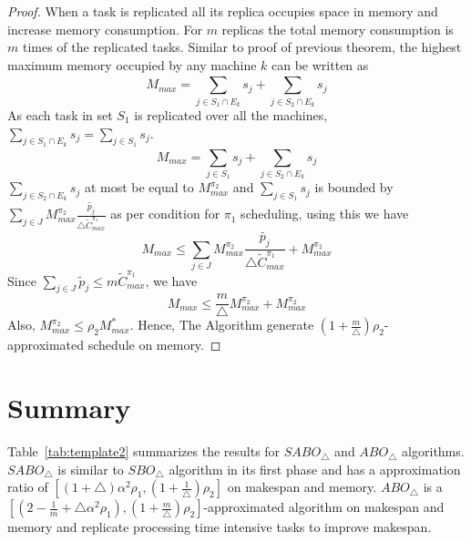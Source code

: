 \documentclass[twocolumn]{svjour3}
\begin{document}
\begin{proof}           
  When a task is replicated all its replica occupies space in memory
  and increase memory consumption. For $m$ replicas the total memory
  consumption is $m$ times of the replicated tasks. Similar to proof
  of previous theorem, the highest maximum memory occupied by any
  machine $k$ can be written as
  \begin{equation}\nonumber
    M_{max}= \sum_{j \in S_1\cap E_k}^{}s_j+\sum_{j \in S_2\cap E_k}^{}s_j           
  \end{equation}
  As each task in set $S_1$ is replicated over all the
  machines,$\sum\limits _{j \in S_1\cap E_k}^{}s_j =\sum\limits _{j
    \in S_1}^{}s_j$.
  \begin{equation}\nonumber
    M_{max} = \sum_{j\in S_1}^{}s_j+\sum_{j \in S_2\cap E_k}^{}s_j           
  \end{equation}    
  $\sum\limits_{j \in S_2\cap E_k}^{}s_j$ at most be equal to
  $M^{\pi_2}_{max} $ and $\sum\limits_{j\in S_1}s_j$ is bounded by
  $\sum\limits_{j \in J}^{} {M^{\pi_2}_{max}}
  \frac{\tilde{p_j}}{\triangle \tilde{C}^{\pi_1}_{max}} $ as per
  condition for $\pi_1$ scheduling, using this we have
  \begin{equation}\nonumber
    M_{max}\leq \sum_{j \in J}^{} {M^{\pi_2}_{max}} \frac{\tilde{p_j}}{\triangle \tilde{C}^{\pi_1}_{max}}+{M^{\pi_2}_{max}}
  \end{equation}
  Since $ \sum\limits_{j \in J}\tilde{p}_j \leq m\tilde{C}^{\pi_1}_{max} $, we have 
  \begin{equation}\nonumber
    M_{max}\leq   \frac{m}{\triangle}{M^{\pi_2}_{max}}+{M^{\pi_2}_{max}}
  \end{equation}
  Also,  ${M^{\pi_2}_{max}} \leq \rho_2 {M^{*}_{max}}$.  Hence, The Algorithm generate $ (1+\frac{m}{\triangle})\rho_2 $- approximated schedule on memory.
\end{proof}
                  
                  
\section{Summary}
Table~\ref{tab:template2} summarizes the results for $SABO_\triangle$
and $ABO_\triangle$ algorithms. $SABO_\triangle$ is similar to $
SBO_\triangle$ algorithm in its first phase and has a approximation
ratio of $[(1+\triangle)\alpha^2 \rho_1,
(1+\frac{1}{\triangle})\rho_2]$ on makespan and memory.
$ABO_\triangle$ is a $ [(2-\frac{1}{m}+\triangle\alpha^2 \rho_1),
(1+\frac{m}{\triangle})\rho_2] $-approximated algorithm on makespan
and memory and replicate processing time intensive tasks to improve
makespan.
     
\end{document}
